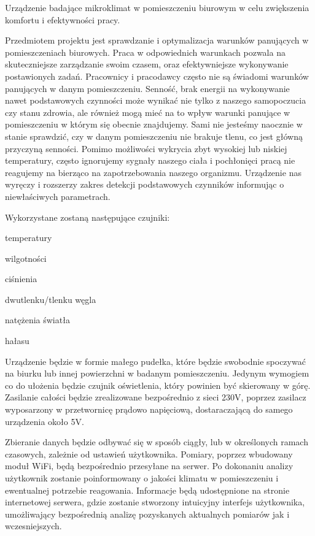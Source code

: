 \documentclass[10pt, a4paper]{article}
\begin{document}
Urządzenie badające mikroklimat w pomieszczeniu biurowym w celu zwiększenia komfortu i efektywności pracy.


Przedmiotem projektu jest sprawdzanie i optymalizacja warunków panujących w pomieszczeniach biurowych. Praca w odpowiednich warunkach pozwala na skuteczniejsze zarządzanie swoim czasem, oraz efektywniejsze wykonywanie postawionych zadań. Pracownicy i pracodawcy często nie są świadomi warunków panujących w danym pomieszczeniu. Senność, brak energii na wykonywanie nawet podstawowych czynności może wynikać nie tylko z naszego samopoczucia czy stanu zdrowia, ale również mogą mieć na to wpływ warunki panujące w pomieszczeniu w którym się obecnie znajdujemy. Sami nie jesteśmy naocznie w stanie sprawdzić, czy w danym pomieszczeniu nie brakuje tlenu, co jest główną przyczyną senności. Pomimo możliwości wykrycia zbyt wysokiej lub niskiej temperatury, często ignorujemy sygnały naszego ciała i pochłonięci pracą nie reagujemy na bierząco na zapotrzebowania naszego organizmu. Urządzenie nas wyręczy i rozszerzy zakres detekcji podstawowych czynników informując o niewłaściwych parametrach.

Wykorzystane zostaną następujące czujniki:

\begin{description}[font=$\bullet$~\normalfont]
\item temperatury
\item wilgotności
\item ciśnienia
\item dwutlenku/tlenku węgla
\item natężenia światła
\item hałasu
\end{description}

Urządzenie będzie w formie małego pudełka, które będzie swobodnie spoczywać na biurku lub innej powierzchni w badanym pomieszczeniu. Jedynym wymogiem co do ułożenia będzie czujnik oświetlenia, który powinien być skierowany w górę. Zasilanie całości będzie zrealizowane bezpośrednio z sieci 230V, poprzez zasilacz wyposarzony w przetwornicę prądowo napięciową, dostaraczającą do samego urządzenia około 5V.

Zbieranie danych będzie odbywać się w sposób ciągły, lub w określonych ramach czasowych, zależnie od ustawień użytkownika. Pomiary, poprzez wbudowany moduł WiFi, będą bezpośrednio przesyłane na serwer. Po dokonaniu analizy użytkownik zostanie poinformowany o jakości klimatu w pomieszczeniu i ewentualnej potrzebie reagowania. Informacje będą udostępnione na stronie internetowej serwera, gdzie zostanie stworzony intuicyjny interfejs użytkownika, umożliwający bezpośrednią analizę pozyskanych aktualnych pomiarów jak i wczesniejszych.
\end{document}
